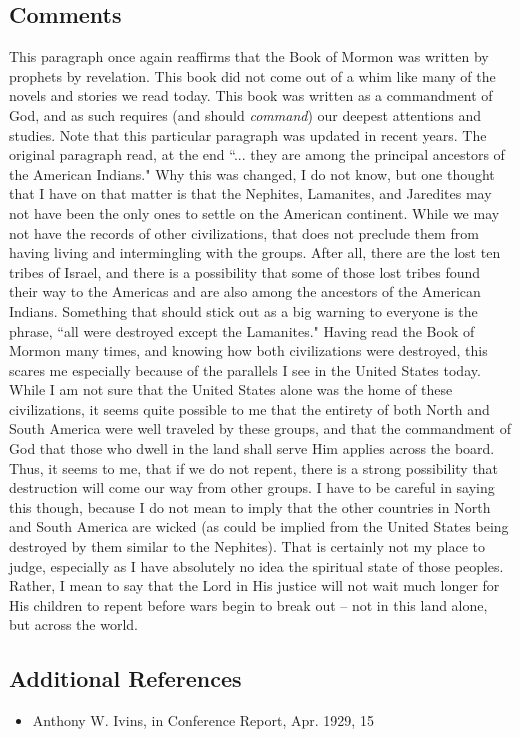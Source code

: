 \documentclass[12pt]{report}
\begin{document}
\subsection{Comments\label{intro:comments2}}
This paragraph once again reaffirms that the Book of Mormon was written by prophets by revelation.  This book did not come out of a whim like many  of the novels and stories we read today.  This book was written as a commandment of God, and as such requires (and should \emph{command}) our deepest attentions and studies.  Note that this particular paragraph was updated in recent years.  The original paragraph read, at the end ``... they are among the principal ancestors of the American Indians."  Why this was changed, I do not know, but one thought that I have on that matter is that the Nephites, Lamanites, and Jaredites may not have been the only ones to settle on the American continent. While we may not have the records of other civilizations, that does not preclude them from having living and intermingling with the groups.  After all, there are the lost ten tribes of Israel, and there is a possibility that some of those lost tribes found their way to the Americas and are also among the ancestors of the American Indians.  Something that should stick out as a big warning to everyone is the phrase, ``all were destroyed except the Lamanites."  Having read the Book of Mormon many times, and knowing how both civilizations were destroyed, this scares me especially because of the parallels I see in the United States today.  While I am not sure that the United States alone was the home of these civilizations, it seems quite possible to me that the entirety of both North and South America were well traveled by these groups, and that the commandment of God that those who dwell in the land shall serve Him applies across the board.  Thus, it seems to me, that if we do not repent, there is a strong possibility that destruction will come our way from other groups.  I have to be careful in saying this though, because I do not mean to imply that the other countries in North and South America are wicked (as could be implied from the United States being destroyed by them similar to the Nephites).  That is certainly not my place to judge, especially as I have absolutely no idea the spiritual state of those peoples.  Rather, I mean to say that the Lord in His justice will not wait much longer for His children to repent before wars begin to break out -- not in this land alone, but across the world.

\subsection{Additional References\label{intro:references2}}
\begin{itemize}
\item Anthony W. Ivins, in Conference Report, Apr. 1929, 15
\end{itemize}
\end{document}
